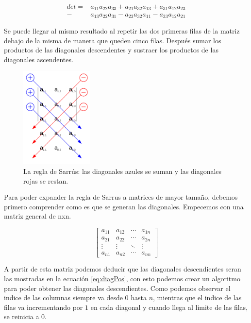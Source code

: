 \documentclass[10pt]{IEEEtran}
\begin{document}
\begin{equation}
  \begin{aligned}
    det =
    &a_{11} a_{22} a_{33} +
    a_{21} a_{32} a_{13} +
    a_{31} a_{12} a_{23}\\
    -
    &a_{13} a_{22} a_{31} -
    a_{23} a_{32} a_{11} -
    a_{33} a_{12} a_{21}
  \end{aligned}
\end{equation}

Se puede llegar al mismo resultado al repetir las dos primeras filas de la matriz debajo de la misma de manera que queden cinco filas. Después sumar los productos de las diagonales descendentes y sustraer los productos de las diagonales ascendentes.

\begin{figure}
  \centering
  \includegraphics[height=2in]{reglaSarrus.png}
  \caption{La regla de Sarrús: las diagonales azules se suman y las diagonales rojas se restan.}
  \label{fig:reglaSarrus}
\end{figure}

Para poder expander la regla de Sarrus a matrices de mayor tamaño, debemos primero comprender como es que se generan las diagonales. Empecemos con una matriz general de nxn.

\begin{equation}
  \begin{bmatrix}
    a_{11} & a_{12} & \cdots & a_{1n} \\
    a_{21} & a_{22} & \cdots & a_{2n} \\
    \vdots & \vdots & \ddots & \vdots \\
    a_{n1} & a_{n2} & \cdots & a_{nn}
  \end{bmatrix}
\end{equation}

A partir de esta matriz podemos deducir que las diagonales descendientes seran las mostradas en la ecuación \ref{eq:diagPos}, con esto podemos crear un algoritmo para poder obtener las diagonales descendientes. Como podemos observar el indice de las columnas siempre va desde $0$ hasta $n$, mientras que el indice de las filas va incrementando por $1$ en cada diagonal y cuando llega al limite de las filas, se reinicia a $0$.
\end{document}
